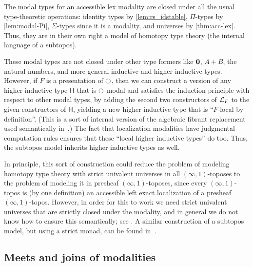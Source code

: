 \begin{rmk}\label{thm:subtopos-model}
  The modal types for an accessible lex modality are closed under all the usual type-theoretic operations: identity types by \cref{lem:rs_idstable}, $\Pi$-types by \cref{lem:modal-Pi}, $\Sigma$-types since it is a modality, and universes by \cref{thm:acc-lex}.
  Thus, they are in their own right a model of homotopy type theory (the internal language of a subtopos).

  These modal types are not closed under other type formers like $\mathbf{0}$, $A+B$, the natural numbers, and more general inductive and higher inductive types.
  However, if $F$ is a presentation of ${\ocircle}$, then we can construct a version of any higher inductive type $\mathsf{H}$ that is ${\ocircle}$-modal and satisfies the induction principle with respect to other modal types, by adding the second two constructors of $\mathcal{L}_{F}$ to the given constructors of $\mathsf{H}$, yielding a new higher inductive type that is ``$F$-local by definition''.
  (This is a sort of internal version of the algebraic fibrant replacement used semantically in~\cite{LumsdaineShulman}.)
  The fact that localization modalities have judgmental computation rules ensures that these ``local higher inductive types'' do too.
  Thus, the subtopos model inherits higher inductive types as well.

  In principle, this sort of construction could reduce the problem of modeling homotopy type theory with strict univalent universes in all $(\infty,1)$-toposes to the problem of modeling it in presheaf $(\infty,1)$-toposes, since every $(\infty,1)$-topos is (by one definition) an accessible left exact localization of a presheaf $(\infty,1)$-topos.
  However, in order for this to work we need strict univalent universes that are strictly closed under the modality, and in general we do not know how to ensure this semantically; see \cite[Remark A.29]{RijkeShulmanSpitters}.
  A similar construction of a subtopos model, but using a strict monad, can be found in~\cite{Stacks,Coquand:stack}.
\end{rmk}


\subsection{Meets and joins of modalities}
\label{sec:poset-modalities}


